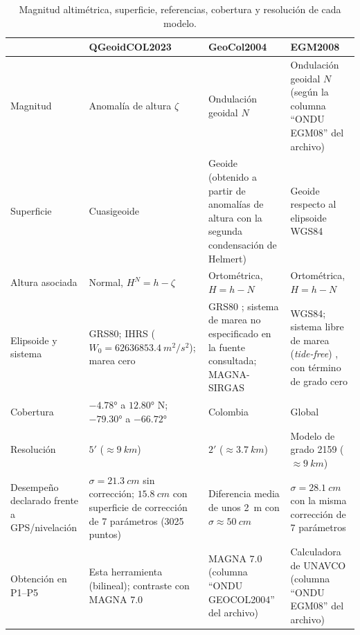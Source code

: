 \documentclass[11pt,letterpaper]{article}
\begin{document}
\begin{table}[H]
\centering
\footnotesize
\setlength{\tabcolsep}{3pt}
\renewcommand{\arraystretch}{1.0}
\caption{Magnitud altimétrica, superficie, referencias, cobertura y resolución de cada modelo.}
\label{tab:magnitudes}
\begin{tabular}{@{}p{2.2cm}p{4.4cm}p{4.4cm}p{4.4cm}@{}}
\toprule
& QGeoidCOL2023 & GeoCol2004 & EGM2008 \\
\midrule
Magnitud & Anomalía de altura $\zeta$ & Ondulación geoidal $N$ & Ondulación geoidal $N$ (según la columna ``ONDU EGM08'' del archivo) \\
Superficie & Cuasigeoide & Geoide (obtenido a partir de anomalías de altura con la segunda condensación de Helmert) & Geoide respecto al elipsoide WGS84 \\
Altura asociada & Normal, $H^N=h-\zeta$ & Ortométrica, $H=h-N$ & Ortométrica, $H=h-N$ \\
Elipsoide y sistema & GRS80; IHRS ($W_0=\SI{62636853.4}{m^2/s^2}$); marea cero \citep{liu2024} & GRS80 \citep{isg}; sistema de marea no especificado en la fuente consultada; MAGNA-SIRGAS & WGS84; sistema libre de marea (\emph{tide-free}) \citep{pavlis2012}, con término de grado cero \\
Cobertura & $\ang{-4.78}$ a $\ang{12.80}$ N; $\ang{-79.30}$ a $\ang{-66.72}$ & Colombia & Global \\
Resolución & $5'$ ($\approx\SI{9}{km}$) & $2'$ ($\approx\SI{3.7}{km}$) \citep{isg} & Modelo de grado 2159 \citep{pavlis2012} ($\approx\SI{9}{km}$) \\
Desempeño declarado frente a GPS/nivelación & $\sigma=\SI{21.3}{cm}$ sin corrección; $\SI{15.8}{cm}$ con superficie de corrección de 7 parámetros (3025 puntos) \citep{liu2024} & Diferencia media de unos \SI{2}{m} con $\sigma\approx\SI{50}{cm}$ \citep{isg,sanchez2003} & $\sigma=\SI{28.1}{cm}$ con la misma corrección de 7 parámetros \citep{liu2024} \\
Obtención en P1--P5 & Esta herramienta (bilineal); contraste con MAGNA 7.0 & MAGNA 7.0 (columna ``ONDU GEOCOL2004'' del archivo) & Calculadora de UNAVCO (columna ``ONDU EGM08'' del archivo) \\
\bottomrule
\end{tabular}
\end{table}
\end{document}
